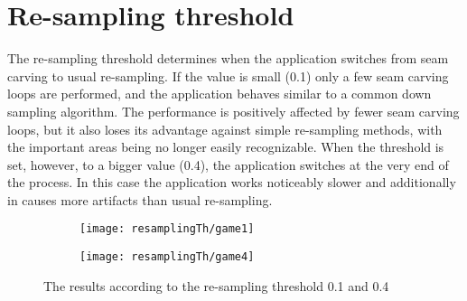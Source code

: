 \documentclass[draft,final]{vutinfth} %
\begin{document}
	\section{Re-sampling threshold}
	\label{res:resampling}
	The re-sampling threshold determines when the application switches from seam carving to usual re-sampling. 
	If the value is small (0.1) only a few seam carving loops are performed, and the application behaves similar to a common down sampling algorithm.
	The performance is positively affected by fewer seam carving loops, but it also loses its advantage against simple re-sampling methods, with the important areas being no longer easily recognizable.
	When the threshold is set, however, to a bigger value (0.4), the application switches at the very end of the process.
	In this case the application works noticeably slower and additionally in causes more artifacts than usual re-sampling.
	\begin{figure}[H]
		\centering
		\begin{subfigure}[b]{0.45\columnwidth}
			\centering
			\texttt{[image: resamplingTh/game1]}
			\label{fig:res:th1}
		\end{subfigure}
		\begin{subfigure}[b]{0.45\columnwidth}
			\centering
			\texttt{[image: resamplingTh/game4]}
			\label{fig:res:th2}
		\end{subfigure}
		\caption{The results according to the re-sampling threshold 0.1 and 0.4}
	\end{figure}  
\end{document}
